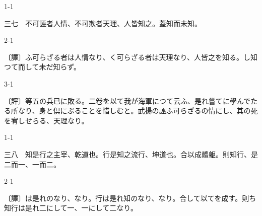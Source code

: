 \documentclass[tate,paper=b6j,jafontsize=9pt]{jlreq}
\begin{document}
\begin{azconvIndented}{1\zw}{-1\zw}

三七　不可誣者人情、不可欺者天理、人皆知之。蓋知而未知。

\end{azconvIndented}
\begin{azconvIndented}{2\zw}{-1\zw}

〔譯〕ふ可らざる者は人情なり、く可らざる者は天理なり、人皆之を知る。し知つて而して未だ知らず。

\end{azconvIndented}
\begin{azconvIndented}{3\zw}{-1\zw}

〔評〕等五の兵已に敗る。二卷を以て我が海軍につて云ふ、是れ嘗てに學んでたる所なり、身と倶にぶることを惜しむと。武揚の誣ふ可らざるの情にし、其の死を宥しせらる、天理なり。

\end{azconvIndented}

\begin{azconvIndented}{1\zw}{-1\zw}

三八　知是行之主宰、乾道也。行是知之流行、坤道也。合以成體躯。則知行、是二而一、一而二。

\end{azconvIndented}
\begin{azconvIndented}{2\zw}{-1\zw}

〔譯〕は是れのなり、なり。行は是れ知のなり、なり。合して以てを成す。則ち知行は是れ二にして一、一にして二なり。

\end{azconvIndented}
\end{document}
